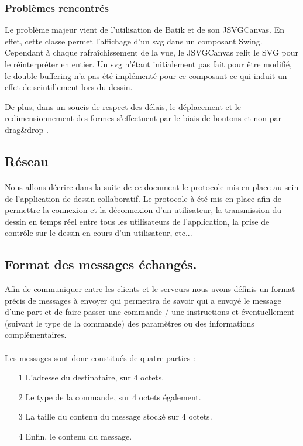 \documentclass[a4paper,11pt]{article}
\begin{document}
\subsubsection{Probl\`emes rencontr\'es}

Le probl\`eme majeur vient de l'utilisation de Batik et de son JSVGCanvas. En effet, cette classe permet l'affichage d'un svg dans un composant Swing. Cependant \`a chaque rafra\^ichissement de la vue, le JSVGCanvas relit le SVG pour le r\'einterpr\'eter en entier. Un svg n'étant initialement pas fait pour être modifié, le double buffering n'a pas été implémenté pour ce composant ce qui induit un effet de scintillement lors du dessin. 

De plus, dans un soucis de respect des d\'elais, le d\'eplacement et le redimensionnement des formes s'effectuent par le biais de boutons et non par \og drag\&drop \fg.

\subsection{Réseau}

\paragraph{} Nous allons décrire dans la suite de ce document le protocole mis en place au sein de l'application de dessin collaboratif. Le protocole à été mis en place afin de permettre la connexion et la déconnexion d'un utilisateur, la transmission du dessin en temps réel entre tous les utilisateurs de l'application, la prise de contrôle sur le dessin en cours d'un utilisateur, etc... 

\subsection{Format des messages échangés.}
Afin de communiquer entre les clients et le serveurs nous avons définis un format précis de messages à envoyer qui permettra de savoir qui a envoyé le message d'une part et de faire passer une commande / une instructions et éventuellement (suivant le type de la commande) des paramètres ou des informations complémentaires.



\paragraph{}Les messages sont donc constitués de quatre parties : 
\begin{itemize}
\item[1] L'adresse du destinataire, sur 4 octets.
\item[2] Le type de la commande, sur 4 octets également.
\item[3] La taille du contenu du message stocké sur 4 octets.
\item[4] Enfin, le contenu du message.
\end{itemize}
\end{document}
